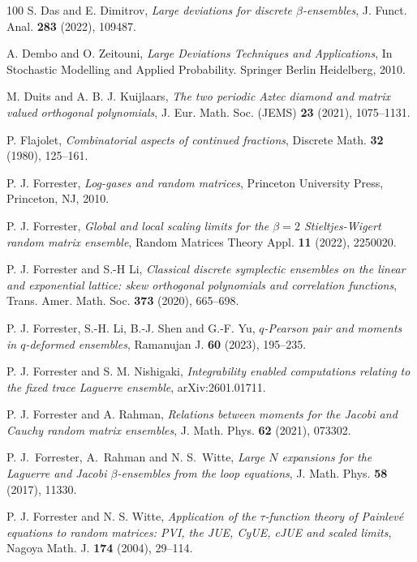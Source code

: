 \documentclass{amsart}
\theoremstyle{plain}
\theoremstyle{remark}
\numberwithin{equation}{section}
\begin{document}
\begin{thebibliography}{100}
 S. Das and E. Dimitrov, \emph{Large deviations for discrete $\beta$-ensembles}, J. Funct. Anal. \textbf{283} (2022), 109487.

 A. Dembo and O. Zeitouni, \emph{Large Deviations Techniques and Applications}, In Stochastic Modelling and Applied Probability. Springer Berlin Heidelberg, 2010. 

 M. Duits and A. B. J. Kuijlaars, \emph{The two periodic Aztec diamond and matrix valued orthogonal polynomials}, J. Eur. Math. Soc. (JEMS) \textbf{23} (2021), 1075--1131.

 P. Flajolet, \emph{Combinatorial aspects of continued fractions}, Discrete Math. \textbf{32} (1980), 125--161.

 P. J. Forrester, \emph{Log-gases and random matrices}, Princeton University Press, Princeton, NJ, 2010.

 P. J. Forrester, \emph{Global and local scaling limits for the $\beta=2$ Stieltjes-Wigert random matrix ensemble}, Random Matrices Theory Appl. \textbf{11} (2022), 2250020. 

 P. J. Forrester and S.-H Li, \textit{Classical discrete symplectic ensembles on the linear and exponential lattice: skew orthogonal polynomials and correlation functions}, Trans. Amer. Math. Soc. \textbf{373} (2020), 665--698.

 P. J. Forrester, S.-H. Li, B.-J. Shen and G.-F. Yu, \emph{$q$-Pearson pair and moments in $q$-deformed ensembles}, Ramanujan J. \textbf{60} (2023), 195--235.
 

 P. J. Forrester and S. M. Nishigaki, \emph{Integrability enabled computations relating to the fixed trace Laguerre ensemble}, arXiv:2601.01711.   

 P. J. Forrester and A. Rahman, \emph{Relations between moments for the Jacobi and Cauchy random matrix ensembles}, J. Math. Phys. \textbf{62} (2021), 073302.

 P. J.~Forrester, A.~Rahman and N. S.~Witte,  \emph{Large $N$ expansions for the Laguerre and Jacobi $\beta$-ensembles from the loop equations}, J. Math. Phys. \textbf{58} (2017), 11330. 

 P. J. Forrester and N. S. Witte, \emph{Application of the $\tau$-function theory of Painlev\'e equations to random matrices: PVI, the JUE, CyUE, cJUE and scaled limits}, Nagoya Math. J. \textbf{174} (2004), 29--114.


\end{thebibliography}
\end{document}

